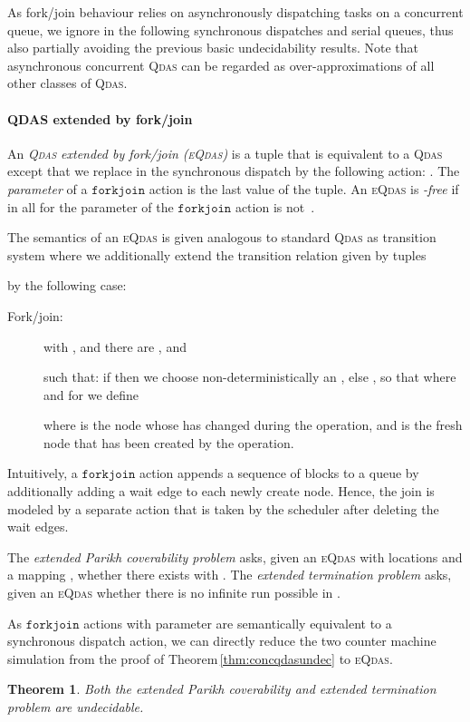 \documentclass[runningheads,oribibl,]{article}
\newcommand{\cfont}[1]{\ensuremath{\mathtt{#1}}\xspace}
\newcommand{\qdas}{\textsc{Qdas}\xspace}
\newcommand{\eqdas}{\textsc{eQdas}\xspace}
\newcommand{\forkjoin}{\ensuremath{\cfont{forkjoin}}\xspace}
\newtheorem{theorem}{Theorem}{}
\begin{document}
As fork/join behaviour relies on asynchronously dispatching tasks
on a concurrent queue, we ignore in the following
synchronous dispatches and serial queues, thus also partially
avoiding the
previous basic undecidability results. Note that asynchronous
concurrent \qdas can be regarded as over-approximations of all other
classes of \qdas.


\paragraph{\bf QDAS extended by fork/join}
An \emph{\qdas extended by fork/join (\eqdas)}
is a tuple 
  that is equivalent to a \qdas except that we replace in 
  the synchronous dispatch by the following action:
  .
  The \emph{parameter} of a \forkjoin action is the last value of the
  tuple.
  An \eqdas is \emph{-free} if in all  for
   the parameter of the \forkjoin action is
  not~.

  The semantics of an \eqdas
  is given analogous to standard \qdas as
  transition system  
  where we additionally extend the transition relation
   given by tuples

by the following case:
\begin{description}
  \item[Fork/join:]  with
    ,
     and there
  are ,  and
  
  such that:
  if  then we choose non-deterministically an , else
  , so that
   where
   and for  we define
  
  where  is the node whose  has changed during the 
  operation, and  is the fresh node that has been created by the
   operation.
\end{description}
Intuitively, a \forkjoin action appends a sequence of blocks to a
queue by additionally adding a wait edge to each newly create node.
Hence, the join is modeled by a separate action that is taken by the
scheduler after deleting the wait edges.

The \emph{extended Parikh
coverability problem} asks, given an \eqdas  with locations
 and a mapping , whether
there exists  with
. The \emph{extended termination problem}
asks, given an \eqdas  whether
there is no infinite run possible in .

As \forkjoin actions with parameter  are semantically
equivalent to a synchronous dispatch action, we can directly
reduce the two counter machine simulation from the proof of
Theorem\,\ref{thm:concqdasundec}  to \eqdas.

\begin{theorem}\label{thm:forkjoin_undec}
  Both  the extended Parikh coverability and extended termination problem are undecidable.
\end{theorem}
\end{document}
